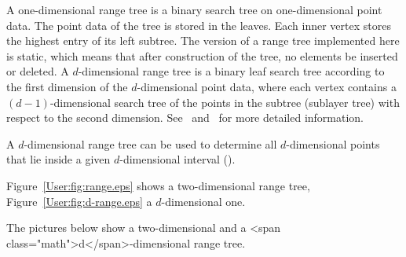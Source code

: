 A one-dimensional range tree is a binary search tree on one-dimensional 
point data. 
The point data of the tree is stored in the leaves. 
Each inner vertex stores the highest entry of its left subtree.
The version of a range tree implemented here is static, which means that 
after construction of the tree, no elements be inserted or deleted.
A $d$-dimensional range tree is a binary leaf search tree according to the 
first dimension of the $d$-dimensional point data, where each vertex contains 
a $(d-1)$-dimensional search tree of the points in the subtree (sublayer tree)
with respect to the second dimension.
See~\cite{bkos-cgaa-97} and~\cite{s-dasds-90} for more detailed information.

A $d$-dimensional range tree can be used to determine all
$d$-dimensional points that lie inside  a given $d$-dimensional
interval ().
\begin{ccTexOnly}
Figure~\ref{User:fig:range.eps} shows a two-dimensional range tree,
Figure~\ref{User:fig:d-range.eps} a $d$-dimensional one.
\end{ccTexOnly}
\begin{ccHtmlOnly}
The pictures below show a two-dimensional and a <span class="math">d</span>-dimensional
range tree.
\end{ccHtmlOnly}
